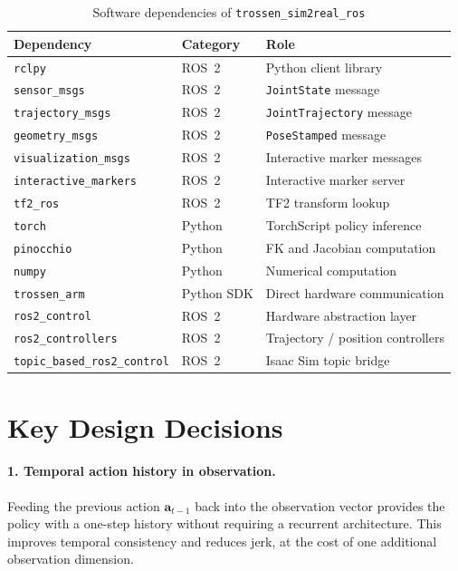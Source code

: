 \documentclass[12pt, a4paper]{article}
\begin{document}
\begin{table}[h]
\centering
\caption{Software dependencies of \texttt{trossen\_sim2real\_ros}}
\label{tab:deps}
\begin{tabular}{lll}
\toprule
\textbf{Dependency} & \textbf{Category} & \textbf{Role} \\
\midrule
\texttt{rclpy}                    & ROS~2      & Python client library \\
\texttt{sensor\_msgs}             & ROS~2      & \texttt{JointState} message \\
\texttt{trajectory\_msgs}         & ROS~2      & \texttt{JointTrajectory} message \\
\texttt{geometry\_msgs}           & ROS~2      & \texttt{PoseStamped} message \\
\texttt{visualization\_msgs}      & ROS~2      & Interactive marker messages \\
\texttt{interactive\_markers}     & ROS~2      & Interactive marker server \\
\texttt{tf2\_ros}                 & ROS~2      & TF2 transform lookup \\
\texttt{torch}                    & Python     & TorchScript policy inference \\
\texttt{pinocchio}                & Python     & FK and Jacobian computation \\
\texttt{numpy}                    & Python     & Numerical computation \\
\texttt{trossen\_arm}             & Python SDK & Direct hardware communication \\
\texttt{ros2\_control}            & ROS~2      & Hardware abstraction layer \\
\texttt{ros2\_controllers}        & ROS~2      & Trajectory / position controllers \\
\texttt{topic\_based\_ros2\_control} & ROS~2   & Isaac Sim topic bridge \\
\bottomrule
\end{tabular}
\end{table}

\section{Key Design Decisions}
\label{sec:design}

\paragraph{1. Temporal action history in observation.}
Feeding the previous action $\mathbf{a}_{t-1}$ back into the observation vector
provides the policy with a one-step history without requiring a recurrent
architecture. This improves temporal consistency and reduces jerk, at the cost
of one additional observation dimension.
\end{document}
